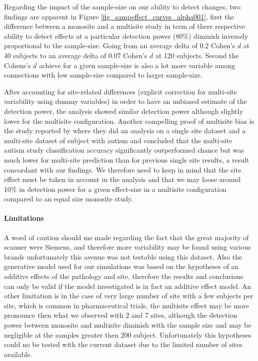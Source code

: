 \documentclass[authoryear]{elsarticle}
\begin{document}
Regarding the impact of the sample-size on our ability to detect changes, two findings are apparent in Figure \ref{fig_sampeffect_curves_alpha001}, first the difference between a monosite and a multisite study in term of there respective ability to detect effects at a particular detection power (80\%) diminish inversely proportional to the sample-size. Going from an average delta of 0.2 Cohen's $d$ at 40 subjects to an average delta of 0.07 Cohen's $d$ at 120 subjects. Second the Cohens's $d$ achieve for a given sample-size is also a lot more variable among connections with low sample-size compared to larger sample-size.



After accounting for site-related differences (explicit correction for multi-site variability using dummy variables) in order to have an unbiased estimate of the detection power, the analysis showed similar detection power although slightly lower for the multisite configuration. Another compelling proof of multisite bias is the study reported by \cite{Nielsen2013} where they did an analysis on a single site dataset and a multi-site dataset of subject with autism and concluded that the multi-site autism study classification accuracy significantly outperformed chance but was much lower for multi-site prediction than for previous single site results, a result concordant with our findings. We therefore need to keep in mind that the site effect must be taken in account in the analysis and that we may loose around 10\% in detection power for a given effect-size in a multisite configuration compared to an equal size monosite study.

\paragraph{Limitations}
A word of caution should me made regarding the fact that the great majority of scanner were Siemens, and therefore more variability may be found using various brands unfortunately this avenue was not testable using this dataset. Also the generative model used for our simulations was based on the hypotheses of an additive effects of the pathology and site, therefore the results and conclusions can only be valid if the model investigated is in fact an additive effect model. An other limitation is in the case of very large number of site with a few subjects per site, which is common in pharmaceutical trials, the multisite effect may be more pronounce then what we observed with 2 and 7 sites, although the detection power between monosite and multisite diminish with the sample size and may be negligible at the samples greater then 200 subject. Unfortunately this hypotheses could no be tested with the current dataset due to the limited number of sites available.
\end{document}
